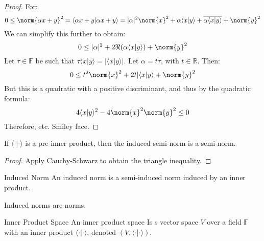 \documentclass[crop=false,class=book,oneside]{standalone}                      %
\begin{document}
        \begin{proof}
            For:
            \begin{equation}
                0\leq\norm{\alpha{x}+y}^{2}
                =\langle{\alpha{x}+y|\alpha{x}+y}\rangle
                =|\alpha|^{2}\norm{x}^{2}
                +\alpha\langle{x|y}\rangle
                +\overline{\alpha\langle{x|y}\rangle}+\norm{y}^{2}
            \end{equation}
            We can simplify this further to obtain:
            \begin{equation}
                0\leq|\alpha|^{2}+2\Re(\alpha\langle{x|y}\rangle)
                    +\norm{y}^{2}
            \end{equation}
            Let $\tau\in\mathbb{F}$ be such that
            $\tau\langle{x|y}\rangle=|\langle{x|y}\rangle|$.
            Let $\alpha=t\tau$, with $t\in\mathbb{R}$. Then:
            \begin{equation}
                0\leq{t}^{2}\norm{x}^{2}+2t|\langle{x|y}\rangle
                    +\norm{y}^{2}
            \end{equation}
            But this is a quadratic with a positive discriminant,
            and thus by the quadratic formula:
            \begin{equation}
                4\langle{x|y}\rangle^{2}-4\norm{x}^{2}\norm{y}^{2}
                \leq{0}
            \end{equation}
            Therefore, etc. Smiley face.
        \end{proof}
        \begin{theorem}
            If $\langle{\cdot|\cdot}\rangle$ is a pre-inner
            product, then the induced semi-norm is a semi-norm.
        \end{theorem}
        \begin{proof}
            Apply Cauchy-Schwarz to obtain the triangle inequality.
        \end{proof}
        \begin{ldefinition}{Induced Norm}
            An induced norm is a semi-induced norm induced
            by an inner product.
        \end{ldefinition}
        \begin{theorem}
            Induced norms are norms.
        \end{theorem}
        \begin{ldefinition}{Inner Product Space}
            An inner product space Is s vector space
            $V$ over a field $\mathbb{F}$ with an
            inner product $\langle{\cdot|\cdot}\rangle$,
            denoted $(V,\langle{\cdot|\cdot}\rangle)$.
        \end{ldefinition}
\end{document}
